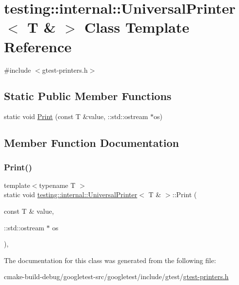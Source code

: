 \hypertarget{classtesting_1_1internal_1_1UniversalPrinter_3_01T_01_6_01_4}{}\section{testing\+::internal\+::Universal\+Printer$<$ T \& $>$ Class Template Reference}
\label{classtesting_1_1internal_1_1UniversalPrinter_3_01T_01_6_01_4}


{\ttfamily \#include $<$gtest-\/printers.\+h$>$}

\subsection*{Static Public Member Functions}
\begin{DoxyCompactItemize}
\item 
static void \mbox{\hyperlink{classtesting_1_1internal_1_1UniversalPrinter_3_01T_01_6_01_4_a923a694be8aa66117848c1c5f57ede35}{Print}} (const T \&value, \+::std\+::ostream $\ast$os)
\end{DoxyCompactItemize}


\subsection{Member Function Documentation}
\mbox{\label{classtesting_1_1internal_1_1UniversalPrinter_3_01T_01_6_01_4_a923a694be8aa66117848c1c5f57ede35}} 
\subsubsection{\texorpdfstring{Print()}{Print()}}
{\footnotesize\ttfamily template$<$typename T $>$ \\
static void \mbox{\hyperlink{classtesting_1_1internal_1_1UniversalPrinter}{testing\+::internal\+::\+Universal\+Printer}}$<$ T \& $>$\+::Print (\begin{DoxyParamCaption}\item[{const T \&}]{value,  }\item[{\+::std\+::ostream $\ast$}]{os }\end{DoxyParamCaption})\hspace{0.3cm}{\ttfamily [inline]}, {\ttfamily [static]}}



The documentation for this class was generated from the following file\+:\begin{DoxyCompactItemize}
\item 
cmake-\/build-\/debug/googletest-\/src/googletest/include/gtest/\mbox{\hyperlink{gtest-printers_8h}{gtest-\/printers.\+h}}\end{DoxyCompactItemize}
